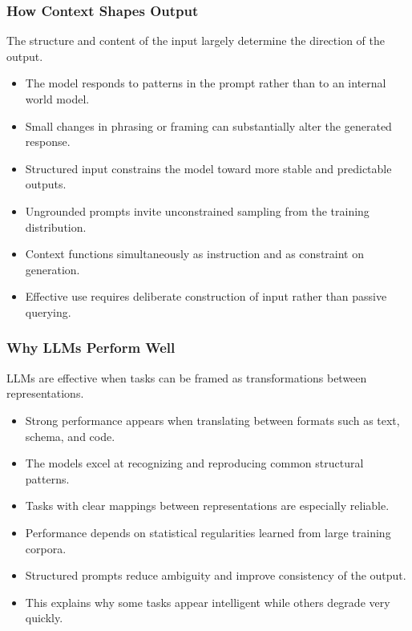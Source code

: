 \documentclass{beamer}
\begin{document}
\frame
{
   \frametitle{How Context Shapes Output}

    The structure and content of the input largely determine the direction of the output.

    \begin{itemize}
        \item The model responds to patterns in the prompt rather than to an internal world model.
        \item Small changes in phrasing or framing can substantially alter the generated response.
        \item Structured input constrains the model toward more stable and predictable outputs.
        \item Ungrounded prompts invite unconstrained sampling from the training distribution.
        \item Context functions simultaneously as instruction and as constraint on generation.
        \item Effective use requires deliberate construction of input rather than passive querying.
    \end{itemize}
}

\frame
{
   \frametitle{Why LLMs Perform Well}

    LLMs are effective when tasks can be framed as transformations between representations.

    \begin{itemize}
        \item Strong performance appears when translating between formats such as text, schema, and code.
        \item The models excel at recognizing and reproducing common structural patterns.
        \item Tasks with clear mappings between representations are especially reliable.
        \item Performance depends on statistical regularities learned from large training corpora.
        \item Structured prompts reduce ambiguity and improve consistency of the output.
        \item This explains why some tasks appear intelligent while others degrade very quickly.
    \end{itemize}
}
\end{document}
